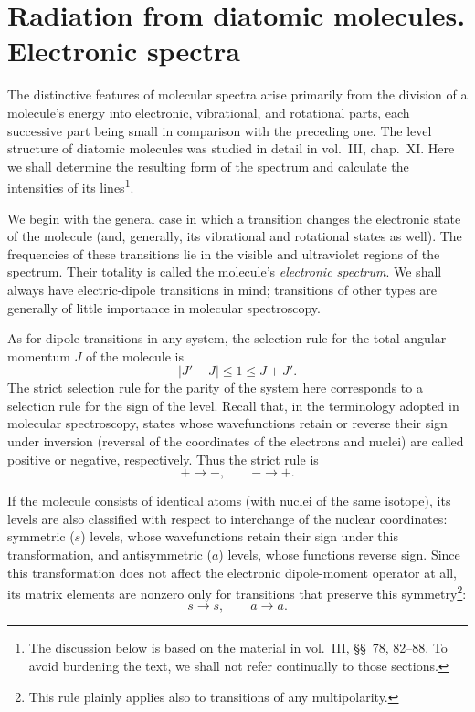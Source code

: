 \section{Radiation from diatomic molecules. Electronic spectra}

The distinctive features of molecular spectra arise primarily from the division of a molecule's energy into electronic, vibrational, and rotational parts, each successive part being small in comparison with the preceding one. The level structure of diatomic molecules was studied in detail in vol.~III, chap.~XI. Here we shall determine the resulting form of the spectrum and calculate the intensities of its lines\footnote{The discussion below is based on the material in vol.~III, \S\S~78, 82--88. To avoid burdening the text, we shall not refer continually to those sections.}.

We begin with the general case in which a transition changes the electronic state of the molecule (and, generally, its vibrational and rotational states as well). The frequencies of these transitions lie in the visible and ultraviolet regions of the spectrum. Their totality is called the molecule's \emph{electronic spectrum}. We shall always have electric-dipole transitions in mind; transitions of other types are generally of little importance in molecular spectroscopy.

As for dipole transitions in any system, the selection rule for the total angular momentum $J$ of the molecule is
\begin{equation}
|J'-J|\leq1\leq J+J'.
\tag{53.1}
\end{equation}
The strict selection rule for the parity of the system here corresponds to a selection rule for the sign of the level. Recall that, in the terminology adopted in molecular spectroscopy, states whose wavefunctions retain or reverse their sign under inversion (reversal of the coordinates of the electrons and nuclei) are called positive or negative, respectively. Thus the strict rule is
\begin{equation}
+\to-,\qquad -\to+.
\tag{53.2}
\end{equation}

If the molecule consists of identical atoms (with nuclei of the same isotope), its levels are also classified with respect to interchange of the nuclear coordinates: symmetric ($s$) levels, whose wavefunctions retain their sign under this transformation, and antisymmetric ($a$) levels, whose functions reverse sign. Since this transformation does not affect the electronic dipole-moment operator at all, its matrix elements are nonzero only for transitions that preserve this symmetry\footnote{This rule plainly applies also to transitions of any multipolarity.}:
\begin{equation}
s\to s,\qquad a\to a.
\tag{53.3}
\end{equation}

